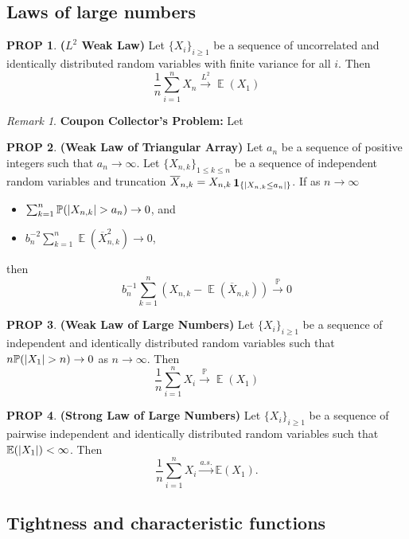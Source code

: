 \documentclass[hidelinks,11pt]{article}
\theoremstyle{definition}
\theoremstyle{dotless}
\newtheorem{prop}{PROP}[section]
\theoremstyle{remark}
\newtheorem*{remark}{Remark}
\DeclareMathOperator{\E}{\mathbb{E}}
\DeclareMathOperator{\1}{\mathbf{1}}
\begin{document}
\subsection{Laws of large numbers}

\begin{prop}\textup{\textbf{($L^2$ Weak Law) }}Let $\{X_i\}_{i\geq1}$ be a sequence of uncorrelated and identically distributed random variables with finite variance for all $i$. Then
\[\frac{1}{n}\sum_{i=1}^nX_n\xrightarrow{L^2}\E(X_1)\]
\end{prop}

\begin{remark}\textup{\textbf{Coupon Collector's Problem:}} Let
\end{remark}

\begin{prop}\textup{\textbf{(Weak Law of Triangular Array) }}Let $a_n$ be a sequence of positive integers such that $a_n\to\infty$. Let $\{X_{n,k}\}_{1\leq k\leq n}$ be a sequence of independent random variables and truncation $\overline{X}_{n,k}=X_{n,k}\1_{\{\abs{X_{n,k}\leq a_n}\}}$. If as $n\to\infty$\begin{itemize}
    \item $\sum_{k=1}^n\mathbb{P}(\abs{X_{n,k}}>a_n)\to0$, and
    \item $b_n^{-2}\sum_{k=1}^n\E(\overline{X}_{n,k}^2)\to0$,
\end{itemize}
then
\[b_n^{-1}\sum_{k=1}^n(X_{n,k}-\E(\overline{X}_{n,k}))\xrightarrow{\mathbb{P}}0\]
\end{prop}

\begin{prop}\textup{\textbf{(Weak Law of Large Numbers) }}Let $\{X_i\}_{i\geq1}$ be a sequence of independent and identically distributed random variables such that $n\mathbb{P}(\abs{X_1}>n)\to0$ as $n\to\infty$. Then
\[\frac{1}{n}\sum_{i=1}^n X_i\xrightarrow{\mathbb{P}}\E(X_1)\]
\end{prop}

\begin{prop}\textup{\textbf{(Strong Law of Large Numbers) }}Let $\{X_i\}_{i\geq1}$ be a sequence of pairwise independent and identically distributed random variables such that $\mathbb{E}(\abs{X_1})<\infty$. Then
\[\frac{1}{n}\sum_{i=1}^nX_i\xrightarrow{a.s.}\mathbb{E}(X_1).\]
\end{prop}

\subsection{Tightness and characteristic functions}
\end{document}
